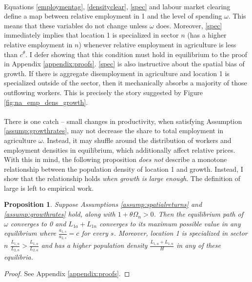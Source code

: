 \documentclass[]{article}
\theoremstyle{plain}
\newtheorem{prop}{Proposition}
\begin{document}
\paragraph*{}
Equations \eqref{employmentag}, \eqref{densityclear}, \eqref{spec} and labour market clearing define a map between relative employment in 1 and the level of spending $\omega$. This means that these variables do not change unless $\omega$ does. Moreover, \eqref{spec} immediately implies that location 1 is specialized in sector $n$ (has a higher relative employment in $n$) whenever relative employment in agriculture is less than $c^{\theta}$. I defer showing that this condition must hold in equilibrium to the proof in Appendix \ref{appendix:proofs}. \eqref{spec} is also instructive about the spatial bias of growth. If there is aggregate disemployment in agriculture and location 1 is specialized outside of the sector, then it mechanically absorbs a majority of those outflowing workers. This is precisely the story suggested by Figure \ref{fig:na_emp_dens_growth}. 
\paragraph*{}
There is one catch -- small changes in productivity, when satisfying Assumption \ref{assump:growthrates}, may not decrease the share to total employment in agriculture $\omega$. Instead, it may shuffle around the distribution of workers and employment densities in equilibrium, which additionally affect relative prices. With this in mind, the following proposition \textit{does not} describe a monotone relationship between the population density of location 1 and growth. Instead, I show that the relationship holds \textit{when growth is large enough}. The definition of large is left to empirical work.

\begin{prop}\label{thm:tradeprop}
Suppose Assumptions \ref{assump:spatialreturns} and \ref{assump:growthrates} hold, along with $1 + \theta\Omega_{n} >0$. Then the equilibrium path of $\omega$ converges to 0 and $L_{1a} + L_{1n}$  converges to its maximum possible value in any equilibrium where $\frac{a_{1,s}}{a_{2,s}} = c$ for every $s$. Moreover, location 1 is specialized in sector $n$  $\frac{L_{1,n}}{L_{2,n}} > \frac{L_{1,a}}{L_{2,a}}$ and has a higher population density $\frac{L_{1,a} + L_{1, n}}{H}$ in any of these equilibria. 
\end{prop}
\begin{proof}
	See Appendix \ref{appendix:proofs}.
\end{proof}
\end{document}
